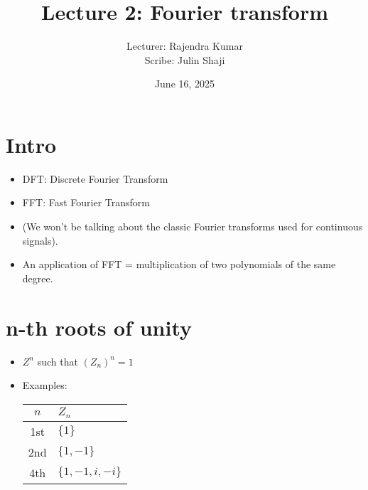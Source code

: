 \documentclass[12pt]{article}
\begin{document}
\title{Lecture 2: Fourier transform}
\author{Lecturer: Rajendra Kumar\\ Scribe: Julin Shaji}
\date{June 16, 2025}
\maketitle

\section{Intro}
\begin{itemize}
\item DFT: Discrete Fourier Transform
\item FFT: Fast Fourier Transform
\item
  (We won't be talking about the classic Fourier transforms used
  for continuous signals).
\item
  An application of FFT = multiplication of two polynomials of the
  same degree.

\end{itemize}

\section{n-th roots of unity}
\begin{itemize}
\item $Z^n$ such that $(Z_n)^n = 1$
\item Examples:\\
  \begin{tabular}{cl}
    \toprule
    $n$  & $Z_n$ \\
    \midrule
   1st & $\{1\}$ \\
   2nd & $\{1, -1\}$ \\
   4th & $\{1, -1, i, -i\}$ \\
    \bottomrule
  \end{tabular}
\end{itemize}
\end{document}

